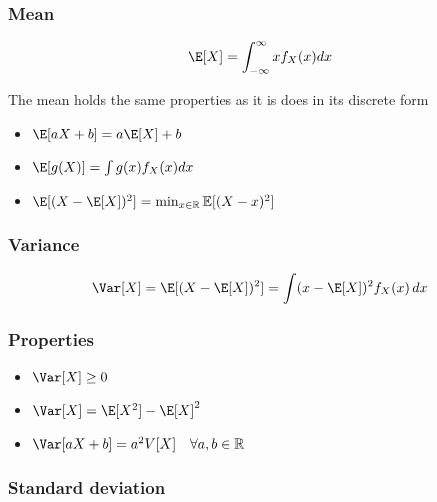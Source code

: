 \subsubsection{Mean} %
\label{ssub:mean}

\begin{equation*}
    \E[X]  = \int_{-\infty}^\infty xf_X(x)dx
\end{equation*}

The mean holds the same properties as it is does in its discrete form
\begin{itemize}
    \item $\E[aX+b] = a\E[X]+b$
    \item $\E[g(X)] = \int g(x)f_X(x)dx$
    \item $\E[(X-\E[X])^2] = \min_{x\in\mathbb{R}} \mathbb{E}[(X-x)^2]$
\end{itemize}

\subsubsection{Variance} %
\label{ssub:variance}

\begin{equation*}
    \Var[X]=\E[(X-\E[X])^2] = \int (x-\E[X])^2 f_X(x)\,dx
\end{equation*}

\subsubsection{Properties} %
\label{ssub:properties09}


\begin{itemize}
    \item $\Var[X]\geq 0$
    \item $\Var[X]=\E[X^2]-\E[X]^2$
    \item $\Var[aX+b] = a^2V[X] \quad \forall a,b \in \mathbb{R}$
\end{itemize}

\subsubsection{Standard deviation} %
\label{ssub:standard_deviation}

